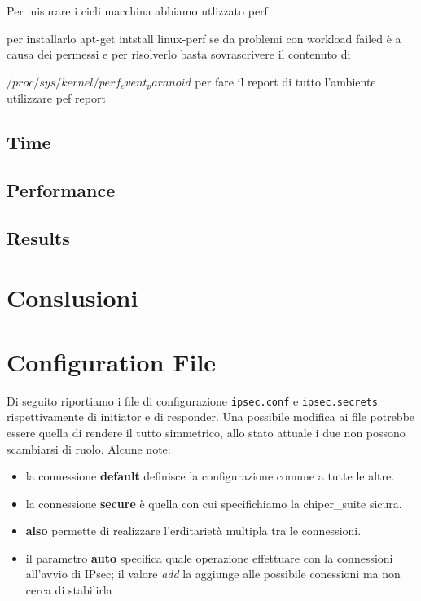 \documentclass[
10pt, %
a4paper, %
oneside, %
headinclude,footinclude, %
BCOR5mm, %
]{scrartcl}
\begin{document}
Per misurare i cicli macchina abbiamo utlizzato perf 

per installarlo apt-get intstall linux-perf se da problemi con workload failed è a causa dei permessi e per risolverlo basta sovrascrivere il contenuto di


$/proc/sys/kernel/perf_event_paranoid$
per fare il report di tutto l'ambiente utilizzare pef report
\subsection{Time}

\subsection{Performance}

\subsection{Results}

\section{Conslusioni}

\newpage

\appendix

\section{Configuration File}
\hypertarget{configuration}{}
Di seguito riportiamo i file di configurazione \lstinline|ipsec.conf| e \lstinline|ipsec.secrets| rispettivamente di 
initiator e di responder. Una possibile modifica ai file potrebbe essere quella di rendere il tutto simmetrico, allo stato 
attuale i due non possono scambiarsi di ruolo. Alcune note:

\begin{itemize}
    \item la connessione \textbf{default} definisce la configurazione comune a tutte le altre.
    \item la connessione \textbf{secure} è quella con cui specifichiamo la chiper\_suite sicura.
    \item \textbf{also} permette di realizzare l'erditarietà multipla tra le connessioni.
    \item il parametro \textbf{auto} specifica quale operazione effettuare con la connessioni all'avvio di IPsec; il valore \textit{add} la aggiunge alle possibile conessioni ma non cerca di stabilirla
\end{itemize}
\end{document}
